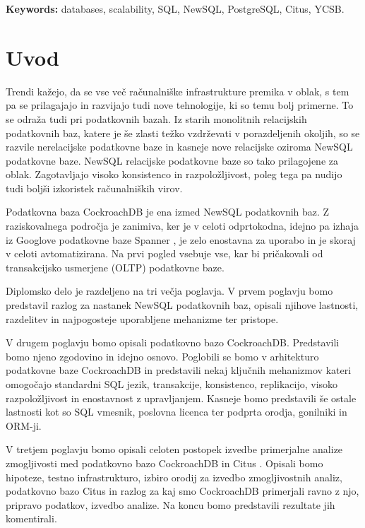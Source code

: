 \documentclass[a4paper, 12pt]{book}
\newcommand{\tkeywordsEn}{databases, scalability, SQL, NewSQL, PostgreSQL, Citus, YCSB}
\newcommand{\clearemptydoublepage}{\newpage{\pagestyle{empty}\cleardoublepage}}
\begin{document}
\noindent\textbf{Keywords:} \tkeywordsEn.
\clearemptydoublepage

\mainmatter
\setcounter{page}{1}
\pagestyle{fancy}


\chapter{Uvod}
Trendi kažejo, da se vse več računalniške infrastrukture premika v oblak, s tem pa se prilagajajo in razvijajo tudi nove tehnologije, ki so temu bolj primerne. To se odraža tudi pri podatkovnih bazah. Iz starih monolitnih relacijskih podatkovnih baz, katere je še zlasti težko vzdrževati v porazdeljenih okoljih, so se razvile nerelacijske podatkovne baze in kasneje nove relacijske oziroma NewSQL podatkovne baze. NewSQL relacijske podatkovne baze so tako prilagojene za oblak. Zagotavljajo visoko konsistenco in razpoložljivost, poleg tega pa nudijo tudi boljši izkoristek računalniških virov.

Podatkovna baza CockroachDB \cite{cockroachdb/cockroach} je ena izmed NewSQL podatkovnih baz. Z raziskovalnega področja je zanimiva, ker je v celoti odprtokodna, idejno pa izhaja iz Googlove podatkovne baze Spanner \cite{spanner-home}, je zelo enostavna za uporabo in je skoraj v celoti avtomatizirana. Na prvi pogled vsebuje vse, kar bi pričakovali od transakcijsko usmerjene (OLTP) podatkovne baze. 

Diplomsko delo je razdeljeno na tri večja poglavja. V prvem poglavju bomo predstavil razlog za nastanek NewSQL podatkovnih baz, opisali njihove lastnosti, razdelitev in najpogosteje uporabljene mehanizme ter pristope.

V drugem poglavju bomo opisali podatkovno bazo CockroachDB. Predstavili bomo njeno zgodovino in idejno osnovo. Poglobili se bomo v arhitekturo podatkovne baze CockroachDB in predstavili nekaj ključnih mehanizmov kateri omogočajo standardni SQL jezik, transakcije, konsistenco, replikacijo, visoko razpoložljivost in enostavnost z upravljanjem. Kasneje bomo predstavili še ostale lastnosti kot so SQL vmesnik, poslovna licenca ter podprta orodja, gonilniki in ORM-ji.

V tretjem poglavju bomo opisali celoten postopek izvedbe primerjalne analize zmogljivosti med podatkovno bazo CockroachDB in Citus \cite{citus}. Opisali bomo hipoteze, testno infrastrukturo, izbiro orodij za izvedbo zmogljivostnih analiz, podatkovno bazo Citus in razlog za kaj smo CockroachDB primerjali ravno z njo, pripravo podatkov, izvedbo analize. Na koncu bomo predstavili rezultate jih komentirali.
\end{document}
